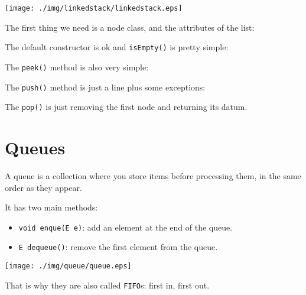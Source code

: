 \documentclass[a4paper, 9pt]{extarticle}
\begin{document}
\begin{center}
  \texttt{[image: ./img/linkedstack/linkedstack.eps]}
\end{center}

The first thing we need is a node class, and the attributes of the list:


The default constructor is ok and \verb+isEmpty()+ is pretty simple:


The \verb+peek()+ method is also very simple:


The \verb+push()+ method is just a line plus some exceptions:


The \verb+pop()+ is just removing the first node and returning its datum.










\section{Queues}

A queue is a collection where you store items before processing them, in the
same order as they appear.

It has two main methods:

\begin{itemize}

  \item \verb+void enque(E e)+: add an element at the end of the queue.

  \item \verb+E dequeue()+: remove the first element from the queue.

\end{itemize}

\begin{center}
  \texttt{[image: ./img/queue/queue.eps]}
\end{center}

That is why they are also called \verb+FIFO+s: first in, first out.
\end{document}
